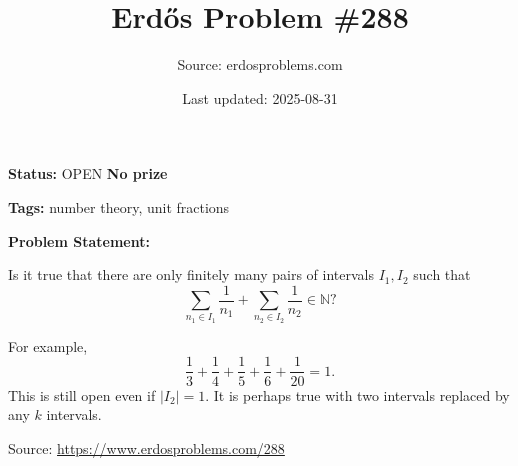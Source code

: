 \documentclass{article}
\title{Erd\H{o}s Problem \#288}
\date{Last updated: 2025-08-31}
\author{Source: erdosproblems.com}
\begin{document}
\maketitle

\noindent\textbf{Status:} OPEN \quad \textbf{No prize}

\noindent\textbf{Tags:} number theory, unit fractions

\medskip

\noindent\textbf{Problem Statement:}

Is it true that there are only finitely many pairs of intervals $I_1,I_2$ such that\[\sum_{n_1\in I_1}\frac{1}{n_1}+\sum_{n_2\in I_2}\frac{1}{n_2}\in \mathbb{N}?\]




For example,\[\frac{1}{3}+\frac{1}{4}+\frac{1}{5}+\frac{1}{6}+\frac{1}{20}=1.\]This is still open even if $\lvert I_2\rvert=1$. It is perhaps true with two intervals replaced by any $k$ intervals.


\bigskip
\noindent\small{Source: \url{https://www.erdosproblems.com/288}}
\end{document}
